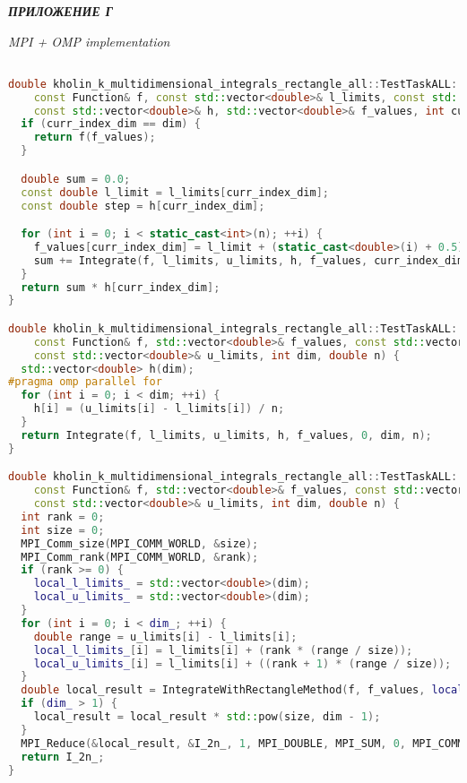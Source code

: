 \documentclass[14pt,a4paper]{article}
\begin{document}
\newpage

{\raggedright\textit{\large\bfseries ПРИЛОЖЕНИЕ Г}\par}

\textit{MPI + OMP implementation}

\begin{framed}
\begin{lstlisting}[language=C++]

double kholin_k_multidimensional_integrals_rectangle_all::TestTaskALL::Integrate(
    const Function& f, const std::vector<double>& l_limits, const std::vector<double>& u_limits,
    const std::vector<double>& h, std::vector<double>& f_values, int curr_index_dim, int dim, double n) {
  if (curr_index_dim == dim) {
    return f(f_values);
  }

  double sum = 0.0;
  const double l_limit = l_limits[curr_index_dim];
  const double step = h[curr_index_dim];

  for (int i = 0; i < static_cast<int>(n); ++i) {
    f_values[curr_index_dim] = l_limit + (static_cast<double>(i) + 0.5) * step;
    sum += Integrate(f, l_limits, u_limits, h, f_values, curr_index_dim + 1, dim, n);
  }
  return sum * h[curr_index_dim];
}

double kholin_k_multidimensional_integrals_rectangle_all::TestTaskALL::IntegrateWithRectangleMethod(
    const Function& f, std::vector<double>& f_values, const std::vector<double>& l_limits,
    const std::vector<double>& u_limits, int dim, double n) {
  std::vector<double> h(dim);
#pragma omp parallel for
  for (int i = 0; i < dim; ++i) {
    h[i] = (u_limits[i] - l_limits[i]) / n;
  }
  return Integrate(f, l_limits, u_limits, h, f_values, 0, dim, n);
}

double kholin_k_multidimensional_integrals_rectangle_all::TestTaskALL::RunMultistepSchemeMethodRectangle(
    const Function& f, std::vector<double>& f_values, const std::vector<double>& l_limits,
    const std::vector<double>& u_limits, int dim, double n) {
  int rank = 0;
  int size = 0;
  MPI_Comm_size(MPI_COMM_WORLD, &size);
  MPI_Comm_rank(MPI_COMM_WORLD, &rank);
  if (rank >= 0) {
    local_l_limits_ = std::vector<double>(dim);
    local_u_limits_ = std::vector<double>(dim);
  }
  for (int i = 0; i < dim_; ++i) {
    double range = u_limits[i] - l_limits[i];
    local_l_limits_[i] = l_limits[i] + (rank * (range / size));
    local_u_limits_[i] = l_limits[i] + ((rank + 1) * (range / size));
  }
  double local_result = IntegrateWithRectangleMethod(f, f_values, local_l_limits_, local_u_limits_, dim, n);
  if (dim_ > 1) {
    local_result = local_result * std::pow(size, dim - 1);
  }
  MPI_Reduce(&local_result, &I_2n_, 1, MPI_DOUBLE, MPI_SUM, 0, MPI_COMM_WORLD);
  return I_2n_;
}


\end{lstlisting}
\end{framed}
\end{document}
